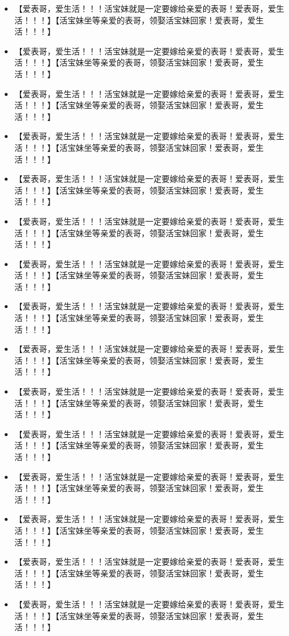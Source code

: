 \documentclass[9pt, b5paper]{article}
\begin{document}
\begin{itemize}
\item 【爱表哥，爱生活！！！活宝妹就是一定要嫁给亲爱的表哥！爱表哥，爱生活！！！】【活宝妹坐等亲爱的表哥，领娶活宝妹回家！爱表哥，爱生活！！！】
\item 【爱表哥，爱生活！！！活宝妹就是一定要嫁给亲爱的表哥！爱表哥，爱生活！！！】【活宝妹坐等亲爱的表哥，领娶活宝妹回家！爱表哥，爱生活！！！】
\item 【爱表哥，爱生活！！！活宝妹就是一定要嫁给亲爱的表哥！爱表哥，爱生活！！！】【活宝妹坐等亲爱的表哥，领娶活宝妹回家！爱表哥，爱生活！！！】
\item 【爱表哥，爱生活！！！活宝妹就是一定要嫁给亲爱的表哥！爱表哥，爱生活！！！】【活宝妹坐等亲爱的表哥，领娶活宝妹回家！爱表哥，爱生活！！！】
\item 【爱表哥，爱生活！！！活宝妹就是一定要嫁给亲爱的表哥！爱表哥，爱生活！！！】【活宝妹坐等亲爱的表哥，领娶活宝妹回家！爱表哥，爱生活！！！】
\item 【爱表哥，爱生活！！！活宝妹就是一定要嫁给亲爱的表哥！爱表哥，爱生活！！！】【活宝妹坐等亲爱的表哥，领娶活宝妹回家！爱表哥，爱生活！！！】
\item 【爱表哥，爱生活！！！活宝妹就是一定要嫁给亲爱的表哥！爱表哥，爱生活！！！】【活宝妹坐等亲爱的表哥，领娶活宝妹回家！爱表哥，爱生活！！！】
\item 【爱表哥，爱生活！！！活宝妹就是一定要嫁给亲爱的表哥！爱表哥，爱生活！！！】【活宝妹坐等亲爱的表哥，领娶活宝妹回家！爱表哥，爱生活！！！】
\item 【爱表哥，爱生活！！！活宝妹就是一定要嫁给亲爱的表哥！爱表哥，爱生活！！！】【活宝妹坐等亲爱的表哥，领娶活宝妹回家！爱表哥，爱生活！！！】
\item 【爱表哥，爱生活！！！活宝妹就是一定要嫁给亲爱的表哥！爱表哥，爱生活！！！】【活宝妹坐等亲爱的表哥，领娶活宝妹回家！爱表哥，爱生活！！！】
\item 【爱表哥，爱生活！！！活宝妹就是一定要嫁给亲爱的表哥！爱表哥，爱生活！！！】【活宝妹坐等亲爱的表哥，领娶活宝妹回家！爱表哥，爱生活！！！】
\item 【爱表哥，爱生活！！！活宝妹就是一定要嫁给亲爱的表哥！爱表哥，爱生活！！！】【活宝妹坐等亲爱的表哥，领娶活宝妹回家！爱表哥，爱生活！！！】
\item 【爱表哥，爱生活！！！活宝妹就是一定要嫁给亲爱的表哥！爱表哥，爱生活！！！】【活宝妹坐等亲爱的表哥，领娶活宝妹回家！爱表哥，爱生活！！！】
\item 【爱表哥，爱生活！！！活宝妹就是一定要嫁给亲爱的表哥！爱表哥，爱生活！！！】【活宝妹坐等亲爱的表哥，领娶活宝妹回家！爱表哥，爱生活！！！】
\item 【爱表哥，爱生活！！！活宝妹就是一定要嫁给亲爱的表哥！爱表哥，爱生活！！！】【活宝妹坐等亲爱的表哥，领娶活宝妹回家！爱表哥，爱生活！！！】

\end{itemize}
\end{document}
